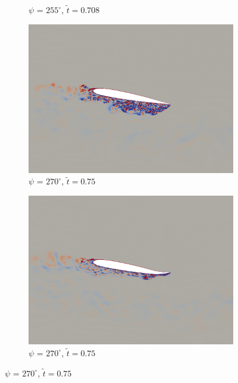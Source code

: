 \begin{figure}[H]
\begin{subfigure}[b]{0.4\textwidth}
		\caption{ $\psi$ = $255^\circ$, $\tilde{t}=0.708$}
		\label{fig:SC1095_AC_psi255}
	\end{subfigure}
	\begin{subfigure}[b]{0.4\textwidth}
		\centering
		\includegraphics[width=1\textwidth]{figures/SC1095/baseline/phase_270.png}
		\caption{ $\psi$ = $270^\circ$, $\tilde{t}=0.75$}
		\label{fig:SC1095_baseline_psi270}
	\end{subfigure}
	\begin{subfigure}[b]{0.4\textwidth}
		\centering
		\includegraphics[width=1\textwidth]{figures/SC1095/AC/phase_270.png}
		\caption{ $\psi$ = $270^\circ$, $\tilde{t}=0.75$}
		\label{fig:SC1095_AC_psi270}
	\end{subfigure}
	

\end{figure}
